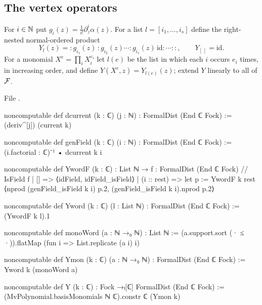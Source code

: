 \subsection{The vertex operators}

\begin{definition}\label{l05:def:Y}
For $i\in{\mathbb{N}}$ put $g_i(z)=\frac1{i!}\partial_z^i\alpha(z)$. For a list $l=[i_1,\ldots,i_s]$ define the
right-nested normal-ordered product
\begin{equation*}
 Y_l(z)={:}g_{i_1}(z)\,{:}g_{i_2}(z)\cdots{:}g_{i_s}(z)\,\mathrm{id}{:}\cdots{:}{:},
 \qquad Y_{[\,]}=\mathrm{id}.
\end{equation*}
For a monomial $X^e=\prod_iX_i^{e_i}$ let $l(e)$ be the list in which each $i$ occurs $e_i$ times, in
increasing order, and define $Y(X^e,z)=Y_{l(e)}(z)$; extend $Y$ linearly to all of $\mathcal{F}$.
\end{definition}

\noindent File .
\begin{leancode}
noncomputable def dcurrent (k : ℂ) (j : ℕ) : FormalDist (End ℂ Fock) :=
  (deriv^[j]) (current k)

noncomputable def genField (k : ℂ) (i : ℕ) : FormalDist (End ℂ Fock) :=
  (i.factorial : ℂ)⁻¹ • dcurrent k i

noncomputable def YwordF (k : ℂ) : List ℕ → { f : FormalDist (End ℂ Fock) // IsField f }
  | [] => ⟨idField, idField_isField⟩
  | (i :: rest) =>
      let p := YwordF k rest
      ⟨nprod (genField_isField k i) p.2, (genField_isField k i).nprod p.2⟩

noncomputable def Yword (k : ℂ) (l : List ℕ) : FormalDist (End ℂ Fock) := (YwordF k l).1

noncomputable def monoWord (a : ℕ →₀ ℕ) : List ℕ :=
  (a.support.sort (· ≤ ·)).flatMap (fun i => List.replicate (a i) i)

noncomputable def Ymon (k : ℂ) (a : ℕ →₀ ℕ) : FormalDist (End ℂ Fock) :=
  Yword k (monoWord a)

noncomputable def Y (k : ℂ) : Fock →ₗ[ℂ] FormalDist (End ℂ Fock) :=
  (MvPolynomial.basisMonomials ℕ ℂ).constr ℂ (Ymon k)
\end{leancode}

